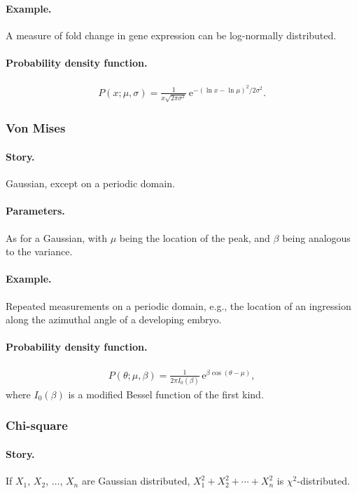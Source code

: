 \paragraph{Example.} A measure of fold change in gene expression can
be log-normally distributed.
\paragraph{Probability density function.}
\begin{align}
P(x;\mu, \sigma) = \frac{1}{x\sqrt{2\pi \sigma^2}}\,\mathrm{e}^{-(\ln x - \ln \mu)^2/2\sigma^2}.
\end{align}


\subsubsection{Von Mises}
\paragraph{Story.} Gaussian, except on a periodic domain.
\paragraph{Parameters.} As for a Gaussian, with $\mu$ being the
location of the peak, and $\beta$ being analogous to the variance.
\paragraph{Example.} Repeated measurements on a periodic domain, e.g.,
the location of an ingression along the azimuthal angle of a
developing embryo.
\paragraph{Probability density function.}
\begin{align}
P(\theta;\mu, \beta) = \frac{1}{2\pi I_0(\beta)}\,\mathrm{e}^{\beta \cos(\theta - \mu)},
\end{align}
where $I_0(\beta)$ is a modified Bessel function of the first kind.


\subsubsection{Chi-square}
\paragraph{Story.} If $X_1$,
$X_2$, $\ldots$, $X_n$ are Gaussian distributed,
$X_1^2 + X_2^2 + \cdots + X_n^2$ is $\chi^2$-distributed.
